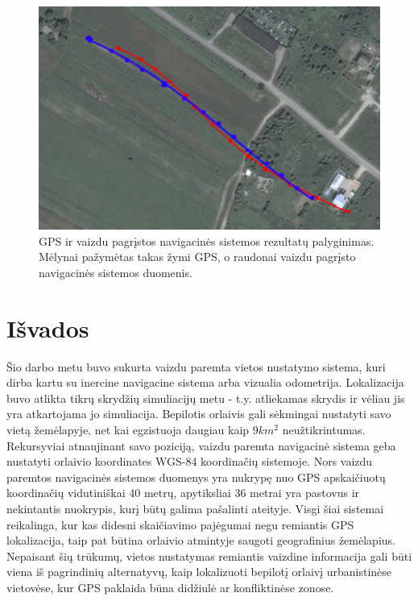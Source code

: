 \documentclass[a4paper,12pt]{article}
\begin{document}
		\begin{figure}[h]
			\centering
			\includegraphics[width=\textwidth]{images/localizationsequnce.png}
			\caption{GPS ir vaizdu pagrįstos navigacinės sistemos rezultatų palyginimas. Mėlynai pažymėtas takas žymi GPS, o raudonai vaizdu pagrįsto navigacinės sistemos duomenis. }
			\label{fig:localizationsequnce}
		\end{figure}
		
	\section{Išvados}
		
			Šio darbo metu buvo sukurta vaizdu paremta vietos nustatymo sistema, kuri dirba kartu su inercine navigacine sistema arba vizualia odometrija. Lokalizacija buvo atlikta tikrų skrydžių simuliacijų metu - t.y. atliekamas skrydis ir vėliau jis yra atkartojama jo simuliacija.		
			Bepilotis orlaivis gali sėkmingai nustatyti savo vietą žemėlapyje, net kai egzistuoja daugiau kaip $9km^2$ neužtikrintumas. Rekursyviai atnaujinant savo poziciją, vaizdu paremta navigacinė sistema geba nustatyti orlaivio koordinates WGS-84 koordinačių sistemoje. Nors vaizdu paremtos navigacinės sistemos duomenys yra nukrypę nuo GPS apskaičiuotų koordinačių vidutiniškai 40 metrų, apytiksliai 36 metrai yra pastovus ir nekintantis nuokrypis, kurį būtų galima pašalinti ateityje.
			Visgi šiai sistemai reikalinga, kur kas didesni skaičiavimo pajėgumai negu remiantis \acrshort{GPS} lokalizacija, taip pat būtina orlaivio atmintyje saugoti geografinius žemėlapius.
			Nepaisant šių trūkumų, vietos nustatymas remiantis vaizdine informacija gali būti viena iš pagrindinių alternatyvų, kaip lokalizuoti bepilotį orlaivį urbanistinėse vietovėse, kur GPS paklaida būna didžiulė ar konfliktinėse zonose.
			
\end{document}
